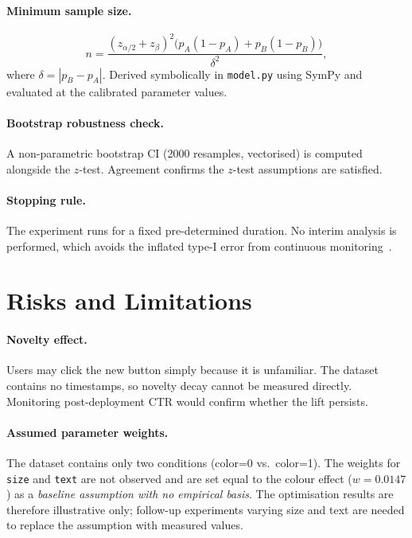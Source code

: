 \documentclass[a4paper,12pt]{extarticle}
\numberwithin{equation}{section}
\begin{document}
\paragraph{Minimum sample size.}
\[
    n = \frac{(z_{\alpha/2} + z_{\beta})^2
        \bigl(p_A(1-p_A) + p_B(1-p_B)\bigr)}{\delta^2},
\]
where $\delta = |p_B - p_A|$. Derived symbolically in \texttt{model.py}
using SymPy and evaluated at the calibrated parameter values.

\paragraph{Bootstrap robustness check.} A non-parametric bootstrap CI
(2000 resamples, vectorised) is computed alongside the $z$-test. Agreement
confirms the $z$-test assumptions are satisfied.

\paragraph{Stopping rule.} The experiment runs for a fixed pre-determined
duration. No interim analysis is performed, which avoids the inflated
type-I error from continuous monitoring~\cite{johari2017peeking}.

\section{Risks and Limitations}

\paragraph{Novelty effect.} Users may click the new button simply because
it is unfamiliar. The dataset contains no timestamps, so novelty decay
cannot be measured directly. Monitoring post-deployment CTR would confirm
whether the lift persists.

\paragraph{Assumed parameter weights.} The dataset contains only two
conditions (color=0 vs.\ color=1). The weights for \texttt{size} and
\texttt{text} are not observed and are set equal to the colour effect
($w = 0.0147$) as a \emph{baseline assumption with no empirical basis}.
The optimisation results are therefore illustrative only; follow-up
experiments varying size and text are needed to replace the assumption with
measured values.
\end{document}

